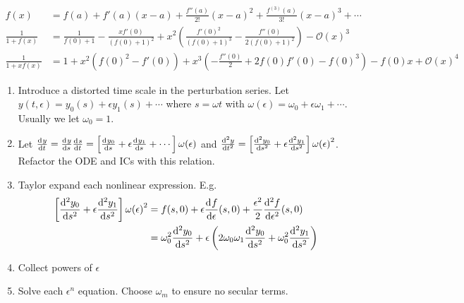 \item[Taylor Series]
  {\tiny
    \begin{align*}
      f(x) &= f(a)+f'(a)(x-a)+\frac{f''(a)}{2!}{(x-a)}^2+\frac{f^{(3)}(a)}{3!}{(x-a)}^3+\cdots \\
      \frac{1}{1+f(x)} &= \frac{1}{f(0)+1}-\frac{x f'(0)}{(f(0)+1)^2}+x^2 \left(\frac{f'(0)^2}{(f(0)+1)^3}-\frac{f''(0)}{2 (f(0)+1)^2}\right)- {\mathcal{O}(x)}^3 \\
      \frac{1}{1+x f(x)} &= 1 + x^2 \left(f(0)^2-f'(0)\right)+x^3 \left(-\frac{f''(0)}{2}+2 f(0) f'(0)-f(0)^3\right)-f(0) x + {\mathcal{O}(x)}^4
    \end{align*}
  }
\item[Poincar\'e-Lindstedt Method] \hfill
  \begin{enumerate}
  \item Introduce a distorted time scale in the perturbation series. Let
    $y(t,\epsilon)=y_0(s) + \epsilon y_1(s) + \cdots$ where $s=\omega t$ with
    $\omega(\epsilon) = \omega_0 + \epsilon\omega_1 + \cdots$. Usually we let
    $\omega_0=1$.
  \item Let $\od{y}{t}=\od{y}{s}\od{s}{t}=\left[\od{y_0}{s} +
      \epsilon\od{y_1}{s} + \cdots\right] \omega(\epsilon)$ and
    $\od[2]{y}{t}=\left[\od[2]{y_0}{s} +
      \epsilon\od[2]{y_1}{s}\right]{\omega(\epsilon)}^2$. Refactor the ODE and
    ICs with this relation.
  \item Taylor expand each nonlinear expression. E.g.
    \begin{align*}
      \left[ \od[2]{y_0}{s}+\epsilon\od[2]{y_1}{s} \right]{\omega(\epsilon)}^2
      &= f(s,0)+\epsilon\od{f}{\epsilon}(s,0) +
        \frac{\epsilon^2}{2}\od[2]{f}{\epsilon}(s,0) \\
      &= \omega_0^2 \od[2]{y_0}{s} + \epsilon\left(2\omega_0\omega_1\od[2]{y_0}{s} +
        \omega_0^2\od[2]{y_1}{s}\right) \
    \end{align*}
  \item Collect powers of $\epsilon$
  \item Solve each $\epsilon^n$ equation. Choose $\omega_m$ to ensure no secular
    terms.
  \end{enumerate}

